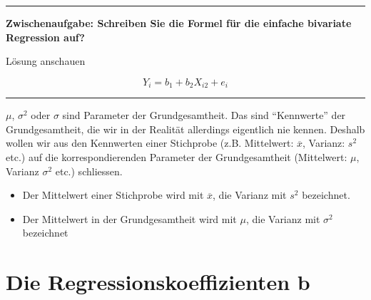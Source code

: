 \documentclass[
  10pt,
  letterpaper,
  a4paper, twoside]{scrreprt}
\providecommand{\tightlist}{%
  \setlength{\itemsep}{0pt}\setlength{\parskip}{0pt}}\usepackage{longtable,booktabs,array}
\begin{document}
\begin{center}\rule{0.5\linewidth}{0.5pt}\end{center}

\textbf{Zwischenaufgabe: Schreiben Sie die Formel für die einfache
bivariate Regression auf?}

Lösung anschauen

\[
  Y_i = b_1 + b_2X_{i2} + e_i 
\]

\begin{center}\rule{0.5\linewidth}{0.5pt}\end{center}

\begin{tcolorbox}[enhanced jigsaw, coltitle=black, opacitybacktitle=0.6, toptitle=1mm, colbacktitle=quarto-callout-important-color!10!white, colback=white, toprule=.15mm, opacityback=0, bottomrule=.15mm, arc=.35mm, colframe=quarto-callout-important-color-frame, leftrule=.75mm, titlerule=0mm, breakable, left=2mm, rightrule=.15mm, title={Q\&A: Wann genau bezeichnet man Kennwerte wie den Mittelwert, die
Varianz oder die Standardabweichung als unbekannte Parameter? Also wann
benutzt man die Symbole \(\mu\), \(\sigma^2\) oder \(\sigma\) und was
ändert das im Vergleich zu den Bezeichnung wie s und \(s^2\)?}, bottomtitle=1mm]

\(\mu\), \(\sigma^2\) oder \(\sigma\) sind Parameter der
Grundgesamtheit. Das sind \enquote{Kennwerte} der Grundgesamtheit, die
wir in der Realität allerdings eigentlich nie kennen. Deshalb wollen wir
aus den Kennwerten einer Stichprobe (z.B. Mittelwert: \(\overline{x}\),
Varianz: \(s^2\) etc.) auf die korrespondierenden Parameter der
Grundgesamtheit (Mittelwert: \(\mu\), Varianz \(\sigma^2\) etc.)
schliessen.

\begin{itemize}
\tightlist
\item
  Der Mittelwert einer Stichprobe wird mit \(\overline{x}\), die Varianz
  mit \(s^2\) bezeichnet.\\
\item
  Der Mittelwert in der Grundgesamtheit wird mit \(\mu\), die Varianz
  mit \(\sigma^2\) bezeichnet
\end{itemize}

\end{tcolorbox}

\section{Die Regressionskoeffizienten
b}\label{die-regressionskoeffizienten-b}
\end{document}
